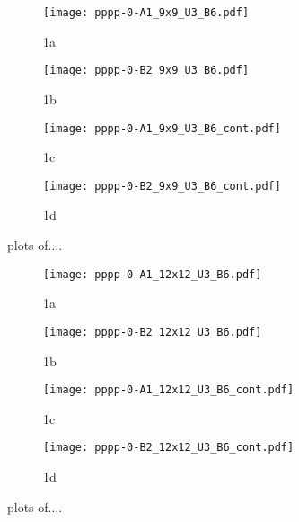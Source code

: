 \begin{figure}
  \begin{subfigure}{.5\textwidth}
    \centering
    \texttt{[image: pppp-0-A1\_9x9\_U3\_B6.pdf]}
    \caption{1a}
    \label{fig:sfig1}
  \end{subfigure}%
  \begin{subfigure}{.5\textwidth}
    \centering
    \texttt{[image: pppp-0-B2\_9x9\_U3\_B6.pdf]}
    \caption{1b}
    \label{fig:sfig2}
  \end{subfigure}
  \begin{subfigure}{.5\textwidth}
      \centering
      \texttt{[image: pppp-0-A1\_9x9\_U3\_B6\_cont.pdf]}
      \caption{1c}
      \label{fig:sfig3}
  \end{subfigure}
  \begin{subfigure}{.5\textwidth}
      \centering
      \texttt{[image: pppp-0-B2\_9x9\_U3\_B6\_cont.pdf]}
      \caption{1d}
      \label{fig:sfig4}
  \end{subfigure}
  \caption{plots of....}
  \label{fig:fig}
\end{figure}

\begin{figure}
  \begin{subfigure}{.5\textwidth}
    \centering
    \texttt{[image: pppp-0-A1\_12x12\_U3\_B6.pdf]}
    \caption{1a}
    \label{fig:sfig1}
  \end{subfigure}%
  \begin{subfigure}{.5\textwidth}
    \centering
    \texttt{[image: pppp-0-B2\_12x12\_U3\_B6.pdf]}
    \caption{1b}
    \label{fig:sfig2}
  \end{subfigure}
  \begin{subfigure}{.5\textwidth}
      \centering
      \texttt{[image: pppp-0-A1\_12x12\_U3\_B6\_cont.pdf]}
      \caption{1c}
      \label{fig:sfig3}
  \end{subfigure}
  \begin{subfigure}{.5\textwidth}
      \centering
      \texttt{[image: pppp-0-B2\_12x12\_U3\_B6\_cont.pdf]}
      \caption{1d}
      \label{fig:sfig4}
  \end{subfigure}
  \caption{plots of....}
  \label{fig:fig}
\end{figure}

